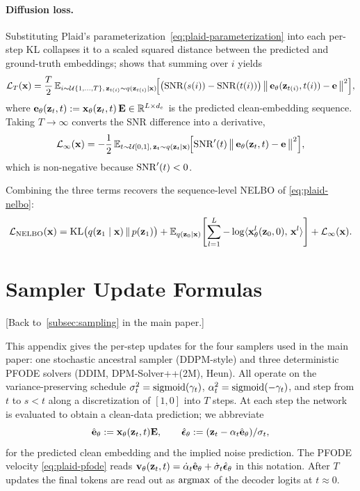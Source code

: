 \documentclass{article}
\begin{document}
\paragraph{Diffusion loss.}
Substituting Plaid's parameterization~\cref{eq:plaid-parameterization} into each per-step KL collapses it to a scaled squared distance between the predicted and ground-truth embeddings; \citep[Eq. (13)]{kingma2021variational} shows that summing over $i$ yields
\begin{align}\label{eq:supp-LT}
    \mathcal{L}_T({\mathbf x}) = \frac{T}{2}\,\mathbb{E}_{i\sim\mathcal{U}\{1,\dots,T\},\,{\mathbf z}_{t(i)}\sim q({\mathbf z}_{t(i)}\mid{\mathbf x})}\!\Bigl[\bigl({\mathrm{SNR}}(s(i))-{\mathrm{SNR}}(t(i))\bigr)\,\bigl\|\,{\mathbf e}_\theta({\mathbf z}_{t(i)}, t(i)) - {\mathbf e}\,\bigr\|^2\Bigr],
\end{align}
where ${\mathbf e}_\theta({\mathbf z}_t, t):={\mathbf x}_\theta({\mathbf z}_t, t)\,{\mathbf E} \in \mathbb{R}^{L\times d_e}$ is the predicted clean-embedding sequence. Taking $T\to\infty$ converts the SNR difference into a derivative,
\begin{align}\label{eq:supp-Linf}
    \mathcal{L}_\infty({\mathbf x}) = -\frac{1}{2}\,\mathbb{E}_{t\sim\mathcal{U}[0,1],\,{\mathbf z}_t\sim q({\mathbf z}_t\mid{\mathbf x})}\!\Bigl[{\mathrm{SNR}}'(t)\,\bigl\|\,{\mathbf e}_\theta({\mathbf z}_t, t) - {\mathbf e}\,\bigr\|^2\Bigr],
\end{align}
which is non-negative because ${\mathrm{SNR}}'(t) < 0$.

Combining the three terms recovers the sequence-level NELBO of \cref{eq:plaid-nelbo}:
\begin{align*}
    \mathcal{L}_{\mathrm{NELBO}}({\mathbf x})
    = \operatorname{KL}\bigl(q({\mathbf z}_1\mid{\mathbf x})\,\|\,p({\mathbf z}_1)\bigr)
    + \mathbb{E}_{q({\mathbf z}_0\mid{\mathbf x})}\!\left[\sum_{l=1}^L -\log\langle{\mathbf x}_\theta^l({\mathbf z}_0, 0),\,{\mathbf x}^l\rangle\right]
    + \mathcal{L}_\infty({\mathbf x}).
\end{align*}

\clearpage

\section{Sampler Update Formulas}
\label{app:sampler}

[Back to~\cref{subsec:sampling} in the main paper.]

This appendix gives the per-step updates for the four samplers used in the main paper: one stochastic ancestral sampler (DDPM-style) and three deterministic PFODE solvers (DDIM, DPM-Solver++(2M), Heun). All operate on the variance-preserving schedule $\sigma_t^2 = \operatorname{sigmoid}(\gamma_t)$, $\alpha_t^2 = \operatorname{sigmoid}(-\gamma_t)$, and step from $t$ to $s < t$ along a discretization of $[1, 0]$ into $T$ steps. At each step the network is evaluated to obtain a clean-data prediction; we abbreviate
\begin{equation*}
  \hat{{\mathbf e}}_\theta := {\mathbf x}_\theta({\mathbf z}_t, t){\mathbf E}, \qquad \hat{{\boldsymbol{\epsilon}}}_\theta := ({\mathbf z}_t - \alpha_t \hat{{\mathbf e}}_\theta)/\sigma_t,
\end{equation*}
for the predicted clean embedding and the implied noise prediction. The PFODE velocity \cref{eq:plaid-pfode} reads ${\mathbf v}_\theta({\mathbf z}_t, t) = \dot\alpha_t \hat{{\mathbf e}}_\theta + \dot\sigma_t \hat{{\boldsymbol{\epsilon}}}_\theta$ in this notation. After $T$ updates the final tokens are read out as $\operatorname*{argmax}$ of the decoder logits at $t \approx 0$.
\end{document}
